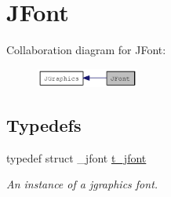 \hypertarget{group__jfont}{
\section{JFont}
\label{group__jfont}
}


Collaboration diagram for JFont:\nopagebreak
\begin{figure}[H]
\begin{center}
\leavevmode
\includegraphics[width=95pt]{group__jfont}
\end{center}
\end{figure}
\subsection*{Typedefs}
\begin{DoxyCompactItemize}
\item 
\hypertarget{group__jfont_ga75f83f853e52af957c799723cac89ae5}{
typedef struct \_\-jfont \hyperlink{group__jfont_ga75f83f853e52af957c799723cac89ae5}{t\_\-jfont}}
\label{group__jfont_ga75f83f853e52af957c799723cac89ae5}

\begin{DoxyCompactList}\small\item\em An instance of a jgraphics font. \item\end{DoxyCompactList}\end{DoxyCompactItemize}
